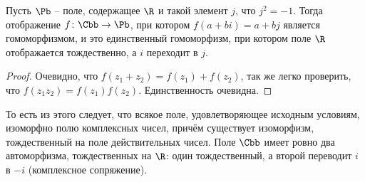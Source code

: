 \begin{theorem}
  Пусть $\Pb$ -- поле, содержащее $\R$ и такой элемент $j$, что $j^2=-1$. Тогда отображение $f\colon \Cbb\to\Pb$, при котором $f(a+bi)=a+bj$ является гомоморфизмом, и это единственный гомоморфизм, при котором поле $\R$ отображается тождественно, а $i$ переходит в $j$.
\end{theorem}
\begin{proof}
  Очевидно, что $f(z_1+z_2)=f(z_1)+f(z_2)$, так же легко проверить, что $f(z_1z_2)=f(z_1)f(z_2)$. Единственность очевидна.
\end{proof}

То есть из этого следует, что всякое поле, удовлетворяющее исходным условиям, изоморфно полю комплексных чисел, причём существует изоморфизм, тождественный на поле действительных чисел. Поле $\Cbb$ имеет ровно два автоморфизма, тождественных на $\R$: один тождественный, а второй переводит $i$ в $-i$ (комплексное сопряжение).
